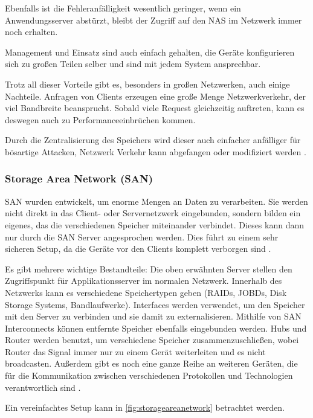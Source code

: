 Ebenfalls ist die Fehleranfälligkeit wesentlich geringer, wenn ein Anwendungsserver abstürzt, bleibt der Zugriff auf den NAS im Netzwerk immer noch erhalten.

Management und Einsatz sind auch einfach gehalten, die Geräte konfigurieren sich zu großen Teilen selber und sind mit jedem System ansprechbar.

Trotz all dieser Vorteile gibt es, besonders in großen Netzwerken, auch einige Nachteile. Anfragen von Clients erzeugen eine große Menge Netzwerkverkehr, der viel Bandbreite beansprucht. Sobald viele Request gleichzeitig auftreten, kann es deswegen auch zu Performanceeinbrüchen kommen.

Durch die Zentralisierung des Speichers wird dieser auch einfacher anfälliger für bösartige Attacken, Netzwerk Verkehr kann abgefangen oder modifiziert werden \parencite[Kap. 1, Adv. and Disadv. of NAS Devices]{gupta.2002}.


\subsubsection{Storage Area Network (SAN)}
\ac{SAN} wurden entwickelt, um enorme Mengen an Daten zu verarbeiten. Sie werden nicht direkt in das Client- oder Servernetzwerk eingebunden, sondern bilden ein eigenes, das die verschiedenen Speicher miteinander verbindet. Dieses kann dann nur durch die SAN Server angesprochen werden. Dies führt zu einem sehr sicheren Setup, da die Geräte vor den Clients komplett verborgen sind \parencite[Kap. 1, SANs]{gupta.2002}.

Es gibt mehrere wichtige Bestandteile: Die oben erwähnten Server stellen den Zugriffspunkt für Applikationsserver im normalen Netzwerk. Innerhalb des Netzwerks kann es verschiedene Speichertypen geben (RAIDs, JOBDs, Disk Storage Systems, Bandlaufwerke).
Interfaces werden verwendet, um den Speicher mit den Server zu verbinden und sie damit zu externalisieren. Mithilfe von SAN Interconnects können entfernte Speicher ebenfalls eingebunden werden. Hubs und Router werden benutzt, um verschiedene Speicher zusammenzuschließen, wobei Router das Signal immer nur zu einem Gerät weiterleiten und es nicht broadcasten.
Außerdem gibt es noch eine ganze Reihe an weiteren Geräten, die für die Kommunikation zwischen verschiedenen Protokollen und Technologien verantwortlich sind \parencite[Kap. 2, SAN Components and Building Blocks]{gupta.2002}.

Ein vereinfachtes Setup kann in \autoref{fig:storageareanetwork} betrachtet werden.

